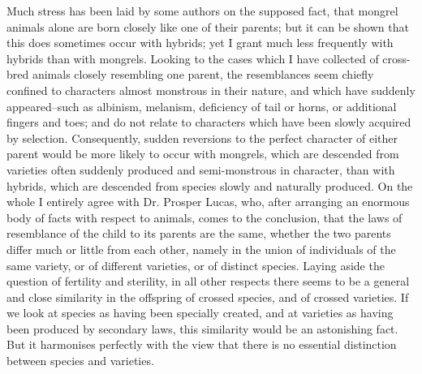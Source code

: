Much stress has been laid by some authors on the supposed fact, that mongrel animals alone are born closely like one of their parents; but it can be shown that this does sometimes occur with hybrids; yet I grant much less frequently with hybrids than with mongrels. Looking to the cases which I have collected of cross-bred animals closely resembling one parent, the resemblances seem chiefly confined to characters almost monstrous in their nature, and which have suddenly appeared--such as albinism, melanism, deficiency of tail or horns, or additional fingers and toes; and do not relate to characters which have been slowly acquired by selection. Consequently, sudden reversions to the perfect character of either parent would be more likely to occur with mongrels, which are descended from varieties often suddenly produced and semi-monstrous in character, than with hybrids, which are descended from species slowly and naturally produced. On the whole I entirely agree with Dr. Prosper Lucas, who, after arranging an enormous body of facts with respect to animals, comes to the conclusion, that the laws of resemblance of the child to its parents are the same, whether the two parents differ much or little from each other, namely in the union of individuals of the same variety, or of different varieties, or of distinct species.
Laying aside the question of fertility and sterility, in all other respects there seems to be a general and close similarity in the offspring of crossed species, and of crossed varieties. If we look at species as having been specially created, and at varieties as having been produced by secondary laws, this similarity would be an astonishing fact. But it harmonises perfectly with the view that there is no essential distinction between species and varieties.

